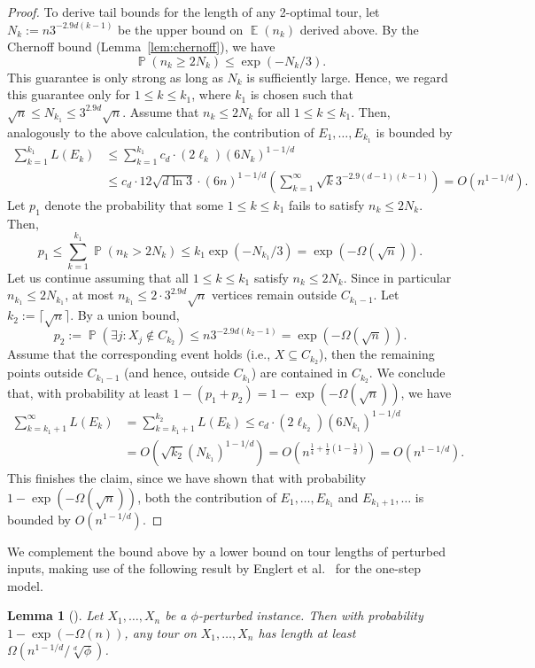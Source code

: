 \documentclass[11pt,DIV=12,a4paper]{scrartcl}
\newtheorem{lemma}[claim]{Lemma}
\DeclareMathOperator{\probab}{\mathbb{P}}
\DeclareMathOperator{\expected}{\mathbb{E}}
\begin{document}
\begin{proof}
To derive tail bounds for the length of any 2-optimal tour, let $N_k := n3^{-2.9d(k-1)}$ be the upper bound on $\expected(n_k)$ derived above. By the Chernoff bound (Lemma~\ref{lem:chernoff}), we have
\[ \probab(n_k \ge 2N_k) \le \exp(-N_k/3).\]
This guarantee is only strong as long as $N_k$ is sufficiently large. Hence, we regard this guarantee only for $1\le k \le k_1$, where $k_1$ is chosen such that $\sqrt{n} \le N_{k_1}\le 3^{2.9d}\sqrt{n}$. Assume that $n_k \le 2N_k$ for all $1\le k \le k_1$. Then, analogously to the above calculation, the contribution of $E_1, \dots, E_{k_1}$ is bounded by
\begin{align*}
  \sum_{k=1}^{k_1} L(E_k) & \le \sum_{k=1}^{k_1} c_d \cdot (2\ell_k) (6N_k)^{1-1/d} \\
& \le c_d \cdot 12\sqrt{d\ln 3}\cdot  (6n)^{1-1/d} \left(\sum_{k=1}^\infty \sqrt{k} 3^{-2.9(d-1)(k-1)}\right) = O(n^{1-1/d}).
\end{align*}
Let $p_1$ denote the probability that some $1\le k \le k_1$ fails to satisfy $n_k \le 2N_k$. Then,
\[ p_1 \le \sum_{k=1}^{k_1} \probab(n_k > 2N_k) \le k_1 \exp(-N_{k_1}/3) = \exp(-\Omega(\sqrt{n})).\]
Let us continue assuming that all $1\le k \le k_1$ satisfy $n_k \le 2N_k$. Since in particular $n_{k_1} \le 2 N_{k_1}$, at most $n_{k_1} \le 2\cdot 3^{2.9d}\sqrt{n}$ vertices remain outside $C_{k_1-1}$. Let $k_2 := \lceil \sqrt{n}\rceil $. By a union bound,
\[ p_2:= \probab(\exists j: X_j \notin C_{k_2}) \le n3^{-2.9d(k_2-1)} = \exp(-\Omega(\sqrt{n})). \]
Assume that the corresponding event holds (i.e., $X\subseteq C_{k_2}$), then the remaining points outside $C_{k_1-1}$ (and hence, outside $C_{k_1}$) are contained in $C_{k_2}$. We conclude that, with probability at least $1-(p_1+p_2)=1-\exp(-\Omega(\sqrt{n}))$, we have
\begin{align*}
 \sum_{k=k_1+1}^\infty L(E_k) & = \sum_{k=k_1+1}^{k_2} L(E_k) \le c_d \cdot (2\ell_{k_2}) (6N_{k_1})^{1-1/d} \\
& = O(\sqrt{k_2}(N_{k_1})^{1-1/d}) = O(n^{\frac{1}{4}+\frac{1}{2}\left(1-\frac{1}{d}\right)}) = O(n^{1-1/d}).
\end{align*}
This finishes the claim, since we have shown that with probability $1-\exp(-\Omega(\sqrt{n}))$, both the contribution of $E_1,\dots,E_{k_1}$ and $E_{k_1+1},\dots$ is bounded by $O(n^{1-1/d})$.
\end{proof}


We complement the bound above by a lower bound on tour lengths of perturbed inputs, making use of the following result by Englert et al.~\cite{EnglertEA:2Opt:2014} for the one-step model.
\begin{lemma}[]\label{lem:phi-lbOPT}
Let $X_1,\dots,X_n$ be a $\phi$-perturbed instance. Then with probability $1-\exp(-\Omega(n))$, any tour on $X_1,\dots,X_n$ has length at least $\Omega(n^{1-1/d}/\sqrt[d]{\phi})$.
\end{lemma}
\end{document}
